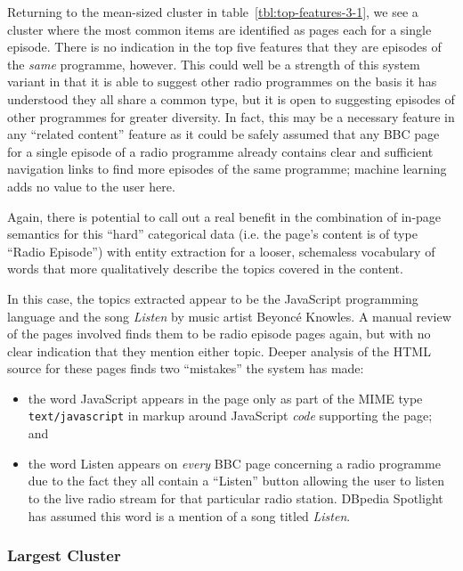 Returning to the mean-sized cluster in table~\ref{tbl:top-features-3-1},
we see a cluster where the most common items are identified as pages
each for a single episode. There is no indication in the top five
features that they are episodes of the \emph{same} programme, however.
This could well be a strength of this system variant in that it is
able to suggest other radio programmes on the basis it has understood
they all share a common type, but it is open to suggesting episodes
of other programmes for greater diversity. In fact, this may be a
necessary feature in any ``related content'' feature as it could
be safely assumed that any BBC page for a single episode of a radio
programme already contains clear and sufficient navigation links to
find more episodes of the same programme; machine learning adds no
value to the user here.

Again, there is potential to call out a real benefit in the
combination of in-page semantics for this ``hard'' categorical
data (i.e. the page's content is of type ``Radio Episode'') with
entity extraction for a looser, schemaless vocabulary of words that
more qualitatively describe the topics covered in the content.

In this case, the topics extracted appear to be the JavaScript
programming language and the song \emph{Listen} by music artist
Beyonc\'e Knowles. A manual review of the pages involved finds them
to be radio episode pages again, but with no clear indication that
they mention either topic. Deeper analysis of the HTML source for
these pages finds two ``mistakes'' the system has made:

\begin{itemize}
\item the word JavaScript appears in the page only as part of the
  MIME type \texttt{text/javascript} in markup around JavaScript
  \emph{code} supporting the page; and
\item the word Listen appears on \emph{every} BBC page concerning
  a radio programme due to the fact they all contain a ``Listen''
  button allowing the user to listen to the live radio stream for
  that particular radio station. DBpedia Spotlight has assumed this
  word is a mention of a song titled \emph{Listen}.
\end{itemize}

\subsubsection{Largest Cluster}

